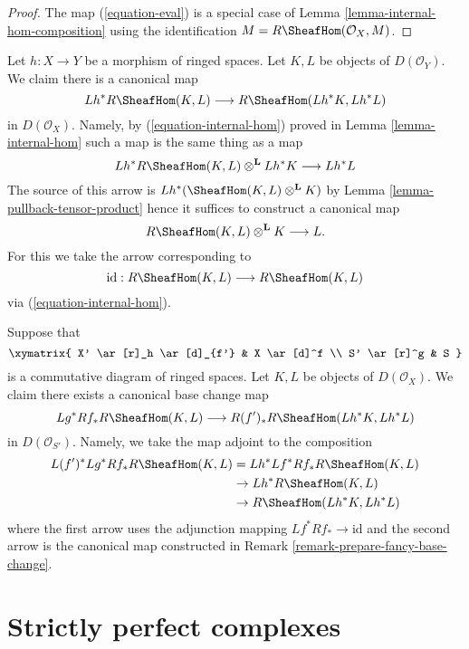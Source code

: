 \begin{proof}
The map (\ref{equation-eval}) is a special case of
Lemma \ref{lemma-internal-hom-composition}
using the identification $M = R\SheafHom(\mathcal{O}_X, M)$.
\end{proof}

\begin{remark}
\label{remark-prepare-fancy-base-change}
Let $h : X \to Y$ be a morphism of ringed spaces.
Let $K, L$ be objects of $D(\mathcal{O}_Y)$. We claim there is a
canonical map
$$
Lh^*R\SheafHom(K, L) \longrightarrow R\SheafHom(Lh^*K, Lh^*L)
$$
in $D(\mathcal{O}_X)$. Namely, by (\ref{equation-internal-hom})
proved in Lemma \ref{lemma-internal-hom}
such a map is the same thing as a map
$$
Lh^*R\SheafHom(K, L) \otimes^\mathbf{L} Lh^*K \longrightarrow Lh^*L
$$
The source of this arrow is $Lh^*(\SheafHom(K, L) \otimes^\mathbf{L} K)$
by Lemma \ref{lemma-pullback-tensor-product}
hence it suffices to construct a canonical map
$$
R\SheafHom(K, L) \otimes^\mathbf{L} K \longrightarrow L.
$$
For this we take the arrow corresponding to
$$
\text{id} :
R\SheafHom(K, L)
\longrightarrow
R\SheafHom(K, L)
$$
via (\ref{equation-internal-hom}).
\end{remark}

\begin{remark}
\label{remark-fancy-base-change}
Suppose that
$$
\xymatrix{
X' \ar[r]_h \ar[d]_{f'} &
X \ar[d]^f \\
S' \ar[r]^g &
S
}
$$
is a commutative diagram of ringed spaces. Let $K, L$ be objects
of $D(\mathcal{O}_X)$. We claim there exists a canonical base change
map
$$
Lg^*Rf_*R\SheafHom(K, L)
\longrightarrow
R(f')_*R\SheafHom(Lh^*K, Lh^*L)
$$
in $D(\mathcal{O}_{S'})$. Namely, we take the map adjoint to
the composition
\begin{align*}
L(f')^*Lg^*Rf_*R\SheafHom(K, L)
& =
Lh^*Lf^*Rf_*R\SheafHom(K, L) \\
& \to
Lh^*R\SheafHom(K, L) \\
& \to
R\SheafHom(Lh^*K, Lh^*L)
\end{align*}
where the first arrow uses the adjunction mapping
$Lf^*Rf_* \to \text{id}$ and the second arrow is the canonical map
constructed in Remark \ref{remark-prepare-fancy-base-change}.
\end{remark}








\section{Strictly perfect complexes}
\label{section-strictly-perfect}

